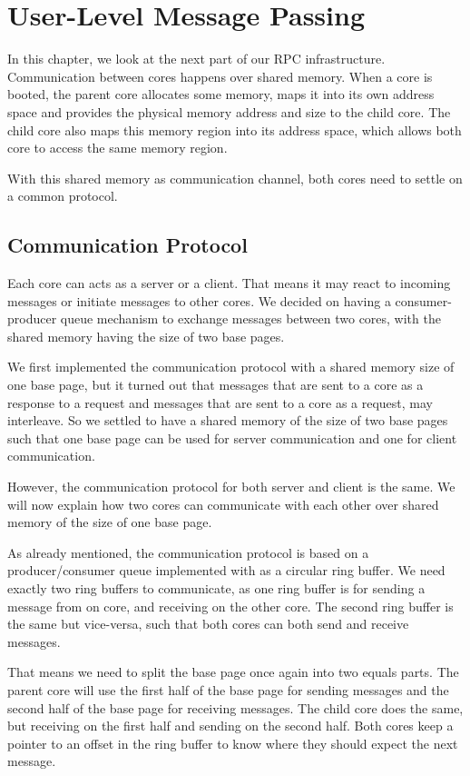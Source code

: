 \chapter{User-Level Message Passing}

In this chapter, we look at the next part of our RPC infrastructure.
Communication between cores happens over shared memory. When a core is booted,
the parent core allocates some memory, maps it into its own address space and provides the physical memory address and size to the child core. The child core also maps this memory region into its address space, which allows both core to access the same memory region. 

With this shared memory as communication channel, both cores need to settle on a common protocol.

\section{Communication Protocol}
Each core can acts as a server or a client. That means it may react to incoming
messages or initiate messages to other cores. We decided on having a consumer-producer queue mechanism to exchange messages between two cores, with the shared memory having the size of two base pages.

We first implemented the communication protocol with a shared memory size of one base page, but it turned out that messages that are sent to a core as a response to a request and messages that are sent to a core as a request, may interleave. So we settled to have a shared memory of the size of two base pages such that one base page can be used for server communication and one for client
communication.

However, the communication protocol for both server and client is the same. We will now explain how two cores can communicate with each other over shared memory of the size of one base page.

As already mentioned, the communication protocol is based on a producer/consumer queue implemented with as a circular ring buffer. We need exactly two ring buffers to communicate, as one ring buffer is for sending a message from on core, and receiving on the other core. The second ring buffer is the same but vice-versa, such that both cores can both send and receive messages. 

That means we need to split the base page once again into two equals parts. The
parent core will use the first half of the base page for sending messages and
the second half of the base page for receiving messages. The child core does the
same, but receiving on the first half and sending on the second half. Both cores
keep a pointer to an offset in the ring buffer to know where they should expect
the next message.


